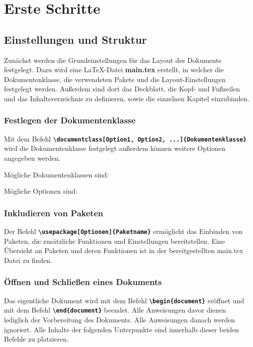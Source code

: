 \section{Erste Schritte}
\subsection{Einstellungen und Struktur}

Zunächst werden die Grundeinstellungen für das Layout des Dokuments festgelegt. Dazu wird eine LaTeX-Datei \textbf{main.tex} erstellt, in welcher die Dokumentenklasse, die verwendeten Pakete und die Layout-Einstellungen festgelegt werden. Außerdem sind dort das Deckblatt, die Kopf- und Fußzeilen und das Inhaltsverzeichnis zu definieren, sowie die einzelnen Kapitel einzubinden.

\subsubsection{Festlegen der Dokumentenklasse}
Mit dem Befehl \textbf{\texttt{\textbackslash documentclass[Option1, Option2, ...]\{Dokumentenklasse\}}} wird die Dokumentenklasse festgelegt außerdem können weitere Optionen angegeben werden.

Mögliche Dokumentenklassen sind:


Mögliche Optionen sind:



\subsubsection{Inkludieren von Paketen}
Der Befehl \textbf{\texttt{\textbackslash usepackage[Optionen]\{Paketname\}}} ermöglicht das Einbinden von Paketen, die zusätzliche Funktionen und Einstellungen bereitstellen.
Eine Übersicht an Paketen und deren Funktionen ist in der bereitgestellten main.tex Datei zu finden.

\subsubsection{Öffnen und Schließen eines Dokuments}
Das eigentliche Dokument wird mit dem Befehl \textbf{\texttt{\textbackslash begin\{document\}}} eröffnet und mit dem Befehl \textbf{\texttt{\textbackslash end\{document\}}} beendet.
Alle Anweisungen davor dienen lediglich der Vorbereitung des Dokuments. Alle Anweisungen danach werden ignoriert. Alle Inhalte der folgenden Unterpunkte sind innerhalb dieser beiden Befehle zu platzieren.

